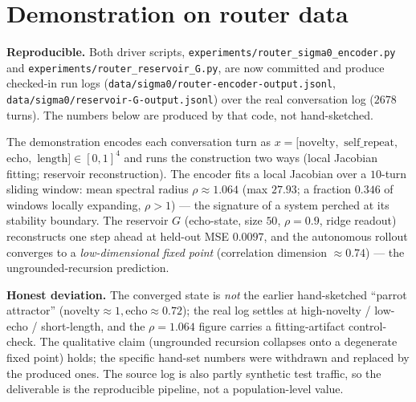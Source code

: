 \documentclass[11pt]{article}
\theoremstyle{definition}
\begin{document}
\section{Demonstration on router data}
\label{sec:demo}
\begin{verifybox}
\textbf{Reproducible.} Both driver scripts,
\texttt{experiments/router\_\allowbreak sigma0\_\allowbreak encoder.py} and
\texttt{experiments/router\_\allowbreak reservoir\_\allowbreak G.py}, are now committed and
produce checked-in run logs (\texttt{data/sigma0/router-encoder-output.jsonl},
\texttt{data/sigma0/reservoir-G-output.jsonl}) over the real conversation log
($2678$ turns). The numbers below are produced by that code, not hand-sketched.
\end{verifybox}
The demonstration encodes each conversation turn as
$x=[\text{novelty},$ \allowbreak$\text{self\_repeat},$ \allowbreak$\text{echo},$ \allowbreak$\text{length}]\in[0,1]^4$ and
runs the construction two ways (local Jacobian fitting; reservoir reconstruction). The
encoder fits a local Jacobian over a $10$-turn sliding window: mean spectral radius
$\rho\approx1.064$ (max $27.93$; a fraction $0.346$ of windows locally expanding,
$\rho>1$) --- the signature of a system perched at its stability boundary. The reservoir
$G$ (echo-state, size $50$, $\rho=0.9$, ridge readout) reconstructs one step ahead at
held-out MSE $0.0097$, and the autonomous rollout converges to a \emph{low-dimensional
fixed point} (correlation dimension $\approx0.74$) --- the ungrounded-recursion prediction.
\begin{caveatbox}
\textbf{Honest deviation.} The converged state is \emph{not} the earlier hand-sketched
``parrot attractor'' ($\text{novelty}\approx1,\text{echo}\approx0.72$); the real log settles
at high-novelty / low-echo / short-length, and the $\rho=1.064$ figure carries a fitting-artifact
control-check. The qualitative claim (ungrounded recursion collapses onto a degenerate
fixed point) holds; the specific hand-set numbers were withdrawn and replaced by the produced
ones. The source log is also partly synthetic test traffic, so the deliverable is the
reproducible pipeline, not a population-level value.
\end{caveatbox}

\end{document}
